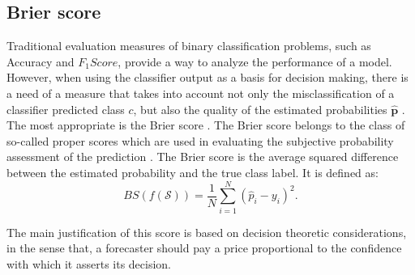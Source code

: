 \subsection{Brier score}
\label{sec:2:brier}

Traditional evaluation measures of binary classification problems, such as Accuracy and 
$F_1Score$, provide a way to analyze the performance of a model. However, when using the classifier 
output as a basis for decision making, there is a need of a measure that takes into account not 
only the misclassification of a classifier predicted class $c$, but also the quality of the 
estimated probabilities $\mathbf{\hat p}$ \citep{cohen2004}. The most appropriate  is the Brier 
score \citep{brier1950}. The Brier score belongs to the class of so-called proper scores which are 
used in evaluating the subjective probability assessment of the prediction \citep{DeGroot1983}. The 
Brier score is the average squared difference between the estimated probability and the true class 
label. It is defined as:
\begin{equation}
  BS(f(\mathcal{S})) = \frac{1}{N} \sum_{i=1}^{N} (\hat p_i - y_i)^2.
\end{equation}

The main justification of this score is based on decision theoretic considerations, in the sense 
that, a forecaster should pay a price proportional to the confidence with which it asserts its 
decision.


\subsection*{}
